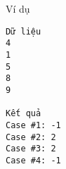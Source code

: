 Ví dụ
\begin{verbatim}
Dữ liệu
4
1
5
8
9

Kết quả
Case #1: -1
Case #2: 2
Case #3: 2
Case #4: -1
\end{verbatim}